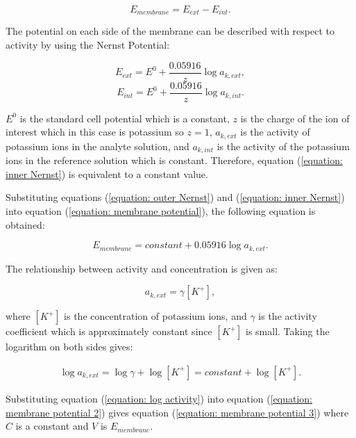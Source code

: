 \begin{equation}
    E_{membrane} = E_{ext} - E_{int}.
    \label{equation: membrane potential}
\end{equation}

The potential on each side of the membrane can be described with respect to activity by using the Nernst Potential:

\begin{equation}
    E_{ext} = E^{0} + \frac{0.05916}{z}\log a_{k,ext}, 
    \label{equation: outer Nernst} 
\end{equation}
\begin{equation}
    E_{int} = E^{0} + \frac{0.05916}{z}\log a_{k,int}.
    \label{equation: inner Nernst}
\end{equation}

\noindent $E^{0}$ is the standard cell potential which is a constant, $z$ is the charge of the ion of interest which in this case is potassium so $z=1$, $a_{k,ext}$ is the activity of potassium ions in the analyte solution, and $a_{k,int}$ is the activity of the potassium ions in the reference solution which is constant. Therefore, equation (\ref{equation: inner Nernst}) is equivalent to a constant value.

Substituting equations (\ref{equation: outer Nernst}) and (\ref{equation: inner Nernst}) into equation (\ref{equation: membrane potential}), the following equation is obtained:

\begin{equation}
    E_{membrane} = constant + 0.05916\log a_{k,ext}.
    \label{equation: membrane potential 2}
\end{equation}

The relationship between activity and concentration is given as:

\begin{equation}
    a_{k,ext} = \gamma [K^{+}],
    \label{equation: activity}
\end{equation}

\noindent where $[K^{+}]$ is the concentration of potassium ions, and $\gamma$ is the activity coefficient which is approximately constant since $[K^{+}]$ is small. Taking the logarithm on both sides gives:

\begin{align}
    \log a_{k,ext} = \log\gamma + \log [K^{+}] = constant + \log [K^{+}].
    \label{equation: log activity}
\end{align}

Substituting equation (\ref{equation: log activity}) into equation (\ref{equation: membrane potential 2}) gives equation (\ref{equation: membrane potential 3}) where $C$ is a constant and $V$ is $E_{membrane}$.

